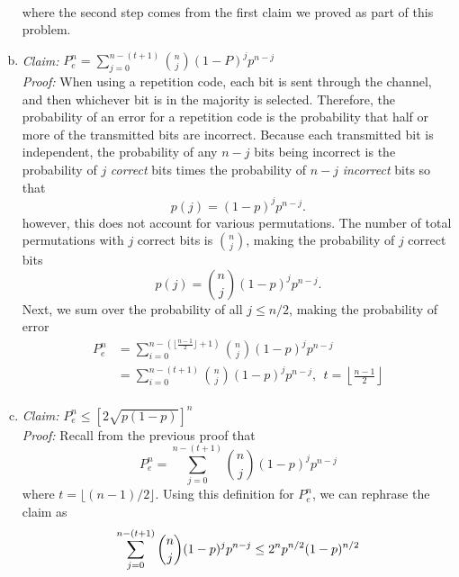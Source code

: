 \documentclass{article}
\begin{document}
\begin{enumerate}[(a)]
\begin{equation*}
\begin{aligned}
						\end{aligned}\end{equation*}
				where the second step comes from the first claim we proved as part of this problem.
	\item {\it Claim: } $P_e^n = \sum_{j = 0}^{n - (t + 1)}{n \choose j} (1 - P)^jp^{n - j}$ \\[0.2in]
				{\it Proof: } When using a repetition code, each bit is sent through the channel, and then whichever bit is in the majority is selected. Therefore, the probability of an error for a repetition code is the probability that half or more of the transmitted bits are incorrect. Because each transmitted bit is independent, the probability of any $n - j$ bits being incorrect is the probability of $j$ {\it correct} bits times the probability of $n - j$ {\it incorrect} bits so that
				\begin{equation*}
					p(j) = (1 - p)^jp^{n - j}.
				\end{equation*}
				however, this does not account for various permutations. The number of total permutations with $j$ correct bits is ${n \choose j}$, making the probability of $j$ correct bits
				\begin{equation*}
					p(j) = {n \choose j}(1 - p)^jp^{n - j}.
				\end{equation*}
				Next, we sum over the probability of all $j \le n/2$, making the probability of error
				\begin{equation*}\begin{aligned}
					P_e^n & = \sum_{i = 0}^{n - (\lfloor \frac{n - 1}{2} \rfloor + 1)} {n \choose j}(1 - p)^jp^{n - j} \\
								& = \sum_{i = 0}^{n - (t + 1)} {n \choose j}(1 - p)^jp^{n - j}, \ \ t =\left\lfloor \frac{n - 1}{2} \right\rfloor \\
				\end{aligned}\end{equation*}
	\item {\it Claim: } $P_e^n \le \left [ 2\sqrt{p(1 - p)}\right ]^n$ \\[0.2in]
				{\it Proof: } Recall from the previous proof that 
					\begin{equation*}
						P_e^n = \sum_{j = 0}^{n - (t + 1)}{n \choose j}(1 - p)^jp^{n - j}
					\end{equation*}
					where $t = \lfloor (n - 1)/2 \rfloor$. Using this definition for $P_e^n$, we can rephrase the claim as
					\begin{equation*}
						    \sum_{j = 0}^{n - (t + 1)}{n \choose j}(1 - p)^jp^{n - j} \le 2^np^{n/2}(1 - p)^{n/2} \\

\end{equation*}
\end{enumerate}
\end{document}
